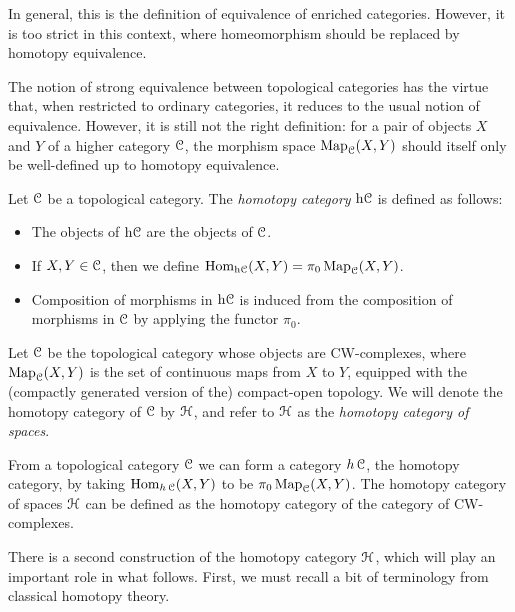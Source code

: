\begin{1.1.3 Equivalences of Top Cats}
\begin{shaded}
In general, this is the definition of equivalence of enriched categories.
However, it is too strict in this context, where homeomorphism should be replaced by homotopy equivalence.
\end{shaded}

The notion of strong equivalence between topological categories has the virtue that, when restricted to ordinary categories, it reduces to the usual notion of equivalence. However, it is still not the right definition: for a pair of objects $X$ and $Y$ of a higher category $\operatorname{\mathcal{C}}$, the morphism space $\operatorname{{Map}}_{\operatorname{\mathcal{C}}}(X,Y)$ should itself only be well-defined up to homotopy equivalence. 

\begin{definition}\label{vergen}
Let $\operatorname{\mathcal{C}}$ be a topological category. The {\it homotopy category} $\rm{h} \it{\operatorname{\mathcal{C}}}$
is defined as follows:
\begin{itemize}
\item The objects of $\rm{h} \it{\operatorname{\mathcal{C}}}$ are the objects of $\operatorname{\mathcal{C}}$.
\item If $X,Y \in \operatorname{\mathcal{C}}$, then we define $\operatorname{Hom}_{\rm{h} \it{\operatorname{\mathcal{C}}}}(X,Y)= \pi_0 \operatorname{{Map}}_{\operatorname{\mathcal{C}}}(X,Y)$.
\item Composition of morphisms in $\rm{h} \it{\operatorname{\mathcal{C}}}$ is induced from the composition of morphisms
in $\operatorname{\mathcal{C}}$ by applying the functor $\pi_0$.
\end{itemize}
\end{definition}

\begin{example}
Let $\operatorname{\mathcal{C}}$ be the topological category whose objects are CW-complexes, where
$\operatorname{{Map}}_{\operatorname{\mathcal{C}}}(X,Y)$ is the set of continuous maps from $X$ to $Y$, equipped with the
(compactly generated version of the) compact-open topology. We will denote the homotopy category of $\operatorname{\mathcal{C}}$ by $\operatorname{\mathcal{H}}$, and refer to $\operatorname{\mathcal{H}}$ as the {\it homotopy category of spaces}.
\end{example}
\begin{shaded}
From a topological category $\operatorname{\mathcal{C}}$ we can form a category $h\operatorname{\mathcal{C}}$, the homotopy category, by taking $\operatorname{Hom}_{h\operatorname{\mathcal{C}}}(X,Y)$ to be $\pi_0\operatorname{{Map}}_{\operatorname{\mathcal{C}}}(X,Y)$. The homotopy category of spaces $\operatorname{\mathcal{H}}$ can be defined as the homotopy category of the category of CW-complexes.
\end{shaded}

There is a second construction of the homotopy category $\operatorname{\mathcal{H}}$, which will play an important role in what follows. First, we must recall a bit of terminology from classical homotopy theory.


\end{1.1.3 Equivalences of Top Cats}
